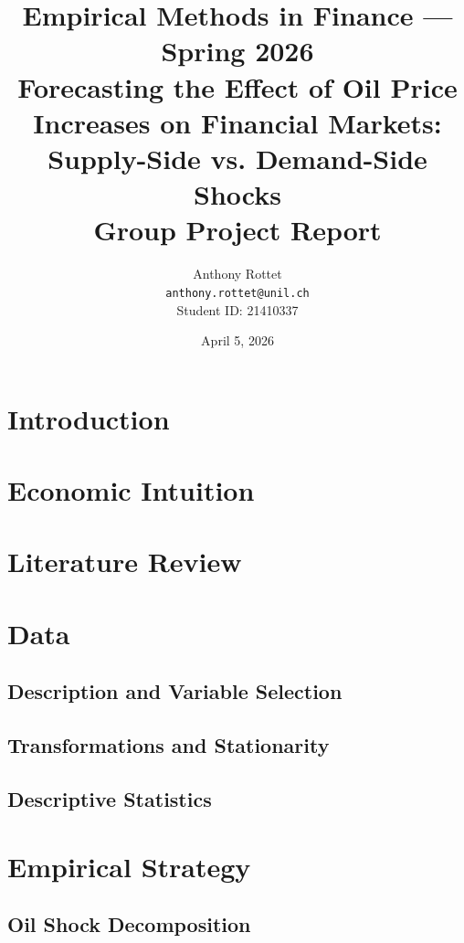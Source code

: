 \documentclass[11pt,a4paper]{article}
\title{%
    \Large \textbf{Empirical Methods in Finance — Spring 2026} \\[0.3cm]
    \vspace{0.5cm}
    \LARGE \textbf{Forecasting the Effect of Oil Price Increases on Financial Markets: Supply-Side vs. Demand-Side Shocks} \\[0.3cm]
    \vspace{0.3cm}
    \large Group Project Report
}
\author{
    Anthony Rottet \\[0.3cm]
    \texttt{anthony.rottet@unil.ch} \\[0.3cm]
    Student ID: 21410337
}
\date{April 5, 2026}
\begin{document}
\maketitle
\thispagestyle{empty}

\begin{abstract}
\noindent

\end{abstract}

\newpage
\tableofcontents
\newpage


\section{Introduction}
\label{sec:introduction}


\section{Economic Intuition}
\label{sec:intuition}


\section{Literature Review}
\label{sec:literature}


\section{Data}
\label{sec:data}

\subsection{Description and Variable Selection}

\subsection{Transformations and Stationarity}

\subsection{Descriptive Statistics}


\section{Empirical Strategy}
\label{sec:methodology}

\subsection{Oil Shock Decomposition}
\end{document}
